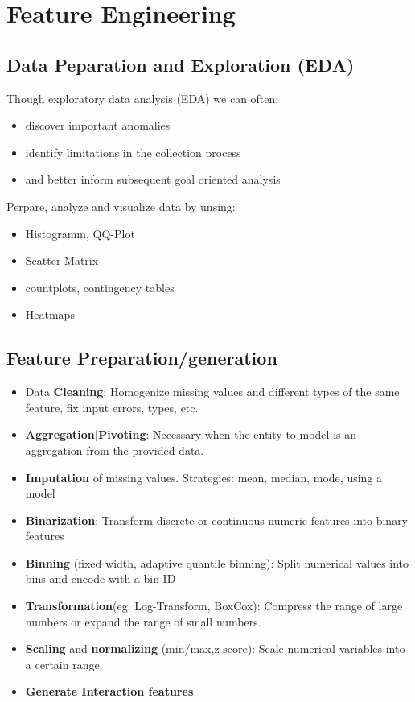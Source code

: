 \section{Feature Engineering}
\subsection{Data Peparation and Exploration (EDA)}
Though exploratory data analysis (EDA) we can often:
\begin{itemize}
    \item discover important anomalies
    \item identify limitations in the collection process
    \item and better inform subsequent goal oriented analysis
\end{itemize}
Perpare, analyze and visualize data by unsing:
\begin{itemize}
    \item Histogramm, QQ-Plot
    \item Scatter-Matrix
    \item countplots, contingency tables
    \item Heatmaps
\end{itemize}

\subsection{Feature Preparation/generation}
\begin{itemize}
    \item Data \textbf{Cleaning}: Homogenize missing values and different types of the same feature, fix input errors, types, etc.
    \item \textbf{Aggregation|Pivoting}: Necessary when the entity to model is an aggregation from the provided data.
    \item \textbf{Imputation }of missing values. Strategies: mean, median, mode, using a model
    \item \textbf{Binarization}: Transform discrete or continuous numeric features into binary features
    \item \textbf{Binning} (fixed width, adaptive quantile binning): Split numerical values into bins and encode with a bin ID 
    \item \textbf{Transformation}(eg. Log-Transform, BoxCox): Compress the range of large numbers or expand the range of small numbers.
    \item \textbf{Scaling} and \textbf{normalizing} (min/max,z-score): Scale numerical variables into a certain range.
    \item \textbf{Generate Interaction features }
\end{itemize}
